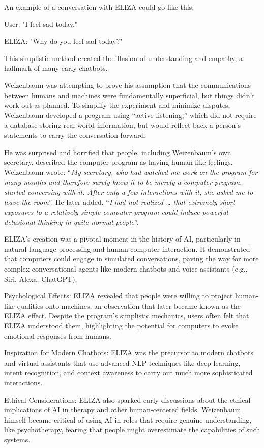 An example of a conversation with ELIZA could go like this:

User: "I feel sad today."

ELIZA: "Why do you feel sad today?"

This simplistic method created the illusion of understanding and empathy, a hallmark of many early chatbots.

Weizenbaum was attempting to prove his assumption that the communications between humans and machines were fundamentally superficial, but things didn’t work out as planned. To simplify the experiment and minimize disputes, Weizenbaum developed a program using “active listening,” which did not require a database storing real-world information, but would reflect back a person’s statements to carry the conversation forward. 

He was surprised and horrified that people, including Weizenbaum’s own secretary, described the computer program as having human-like feelings. Weizenbaum wrote: “\textit{My secretary, who had watched me work on the program for many months and therefore surely knew it to be merely a computer program, started conversing with it. After only a few interactions with it, she asked me to leave the room}”. He later added, “\textit{I had not realized … that extremely short exposures to a relatively simple computer program could induce powerful delusional thinking in quite normal people}”.

ELIZA’s creation was a pivotal moment in the history of AI, particularly in natural language processing and human-computer interaction. It demonstrated that computers could engage in simulated conversations, paving the way for more complex conversational agents like modern chatbots and voice assistants (e.g., Siri, Alexa, ChatGPT).

Psychological Effects: ELIZA revealed that people were willing to project human-like qualities onto machines, an observation that later became known as the ELIZA effect. Despite the program’s simplistic mechanics, users often felt that ELIZA understood them, highlighting the potential for computers to evoke emotional responses from humans.

Inspiration for Modern Chatbots: ELIZA was the precursor to modern chatbots and virtual assistants that use advanced NLP techniques like deep learning, intent recognition, and context awareness to carry out much more sophisticated interactions.

Ethical Considerations: ELIZA also sparked early discussions about the ethical implications of AI in therapy and other human-centered fields. Weizenbaum himself became critical of using AI in roles that require genuine understanding, like psychotherapy, fearing that people might overestimate the capabilities of such systems.

